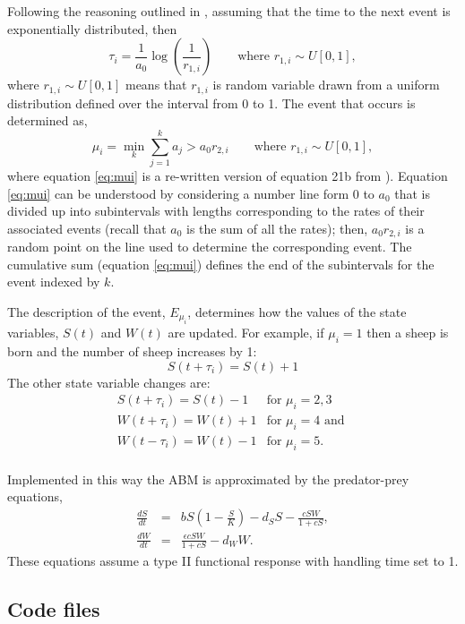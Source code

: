 \documentclass[11pt, oneside]{article}   	%
\begin{document}
Following the reasoning outlined in \cite{Gillespie}, assuming that the time to the next event is exponentially distributed, then
%
\begin{equation}\label{eq:taui}
\tau_i = \frac{1}{a_0}\log \left(\frac{1}{r_{1,i}} \right) \qquad \mbox{where $r_{1,i} \sim U[0,1]$},
\end{equation}
%
where  $r_{1,i} \sim U[0,1]$ means that $r_{1,i}$ is random variable drawn from a uniform distribution defined over the interval from 0 to 1. The event that occurs is determined as,
%
\begin{equation}\label{eq:mui}
\mu_i = \min_k\sum_{j=1}^{k} a_j> a_0 r_{2,i} \qquad \mbox{where $r_{1,i} \sim U[0,1]$}, 
\end{equation}
%
where equation \ref{eq:mui} is a re-written version of equation 21b from \cite{Gillespie}). Equation \ref{eq:mui} can be understood by considering a number line form $0$ to $a_0$ that is divided up into subintervals with lengths corresponding to the rates of their associated events (recall that $a_0$ is the sum of all the rates); then, $a_0r_{2,i}$ is a random point on the line used to determine the corresponding event. The cumulative sum (equation \ref{eq:mui}) defines the end of the subintervals for the event indexed by $k$.

The description of the event, $E_{\mu_i}$, determines how the values of the state variables, $S(t)$ and $W(t)$ are updated. For example, if $\mu_i = 1$ then a sheep is born and the number of sheep increases by 1:
%
\[ S(t+\tau_i) = S(t) + 1\]
%
The other state variable changes are:
\[ \begin{array}{ll}
S(t+\tau_i) = S(t) - 1 & \mbox{for } \mu_i = 2, 3 \\
W(t+\tau_i) = W(t) + 1 & \mbox{for } \mu_i = 4 \mbox{ and } \\
W(t-\tau_i) = W(t) - 1 & \mbox{for } \mu_i = 5. \\
\end{array}
\]

Implemented in this way the ABM is approximated by the predator-prey equations,
%
\begin{eqnarray}\label{eq:PP1}
\frac{dS}{dt} & = & bS\left(1-\frac{S}{K}\right) - d_S S - \frac{c SW}{1+cS}, \\
\frac{dW}{dt} & = &  \frac{\epsilon c SW}{1+cS} - d_W W.\label{eq:PP2}
\end{eqnarray}
%
These equations assume a type II functional response with handling time set to 1.

\subsection{Code files}
\end{document}
